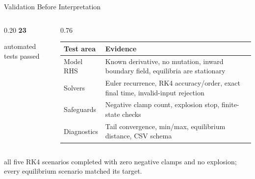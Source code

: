 \begin{frame}{Validation Before Interpretation}
  \begin{columns}[T,onlytextwidth]
    \begin{column}{0.20\textwidth}
      \centering
      {\color{HUSTNavy}\fontsize{42}{46}\selectfont\bfseries 23}\par
      \vspace{0.1cm}
      {\fontsize{15}{18}\selectfont automated tests passed}
    \end{column}
    \begin{column}{0.76\textwidth}
      \renewcommand{\arraystretch}{1.15}
      \begin{tabular}{p{}p{}}
        \toprule
        Test area & Evidence \\
        \midrule
        Model RHS & Known derivative, no mutation, inward boundary field,
                    equilibria are stationary \\
        Solvers & Euler recurrence, RK4 accuracy/order, exact final time,
                  invalid-input rejection \\
        Safeguards & Negative clamp count, explosion stop, finite-state checks \\
        Diagnostics & Tail convergence, min/max, equilibrium distance, CSV schema \\
        \bottomrule
      \end{tabular}
    \end{column}
  \end{columns}

  \vspace{0.35cm}
   all five RK4 scenarios completed with zero
  negative clamps and no explosion; every equilibrium scenario matched its target.
\end{frame}
